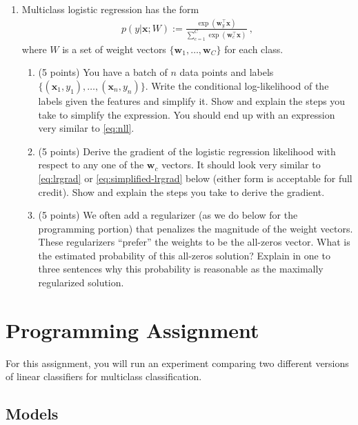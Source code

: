 \documentclass[10pt]{article}
\newcommand{\bx}{{\boldsymbol x}}
\newcommand{\bw}{{\boldsymbol w}}
\begin{document}
\begin{enumerate}

\item Multiclass logistic regression has the form
\begin{align}
p(y | \bx; W) := \frac{\exp(\bw_y^\top \bx)}{\sum_{c = 1}^C \exp(\bw_c^\top \bx)} ~,
\label{eq:mclogistic} 
\end{align}
where $W$ is a set of weight vectors $\{\bw_1, \ldots, \bw_C\}$ for each class. 

\begin{enumerate}

\item (5 points) You have a batch of $n$ data points and labels $\{(\bx_1, y_1), \ldots, (\bx_n, y_n)\}$. Write the conditional log-likelihood of the labels given the features and simplify it. Show and explain the steps you take to simplify the expression. You should end up with an expression very similar to \cref{eq:nll}.

\item (5 points) Derive the gradient of the logistic regression likelihood with respect to any one of the $\bw_c$ vectors. It should look very similar to \cref{eq:lrgrad} or \cref{eq:simplified-lrgrad} below (either form is acceptable for full credit). Show and explain the steps you take to derive the gradient.

\item (5 points) We often add a regularizer (as we do below for the programming portion) that penalizes the magnitude of the weight vectors. These regularizers ``prefer'' the weights to be the all-zeros vector. What is the estimated probability of this all-zeros solution? Explain in one to three sentences why this probability is reasonable as the maximally regularized solution.

\end{enumerate}

\end{enumerate}

\section*{Programming Assignment}

For this assignment, you will run an experiment comparing two different versions of linear classifiers for multiclass classification. 

\subsection*{Models}
\end{document}
